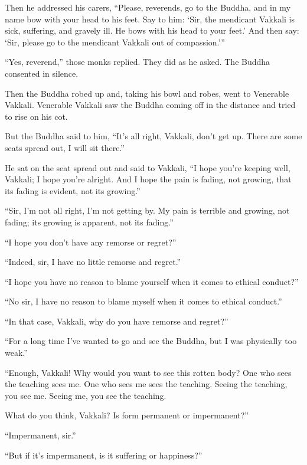 \documentclass[12pt,openany]{book}%
\begin{document}
Then he addressed his carers, “Please, reverends, go to the Buddha, and in my name bow with your head to his feet. Say to him: ‘Sir, the mendicant Vakkali is sick, suffering, and gravely ill. He bows with his head to your feet.’ And then say: ‘Sir, please go to the mendicant Vakkali out of compassion.’” 

“Yes, reverend,” those monks replied. They did as he asked. The Buddha consented in silence. 

Then the Buddha robed up and, taking his bowl and robes, went to Venerable Vakkali. Venerable Vakkali saw the Buddha coming off in the distance and tried to rise on his cot. 

But the Buddha said to him, “It’s all right, Vakkali, don’t get up. There are some seats spread out, I will sit there.” 

He sat on the seat spread out and said to Vakkali, “I hope you’re keeping well, Vakkali; I hope you’re alright. And I hope the pain is fading, not growing, that its fading is evident, not its growing.” 

“Sir, I’m not all right, I’m not getting by. My pain is terrible and growing, not fading; its growing is apparent, not its fading.” 

“I hope you don’t have any remorse or regret?” 

“Indeed, sir, I have no little remorse and regret.” 

“I hope you have no reason to blame yourself when it comes to ethical conduct?” 

“No sir, I have no reason to blame myself when it comes to ethical conduct.” 

“In that case, Vakkali, why do you have remorse and regret?” 

“For a long time I’ve wanted to go and see the Buddha, but I was physically too weak.” 

“Enough, Vakkali! Why would you want to see this rotten body? One who sees the teaching sees me. One who sees me sees the teaching. Seeing the teaching, you see me. Seeing me, you see the teaching. 

What do you think, Vakkali? Is form permanent or impermanent?” 

“Impermanent, sir.” 

“But if it’s impermanent, is it suffering or happiness?” 
\end{document}
